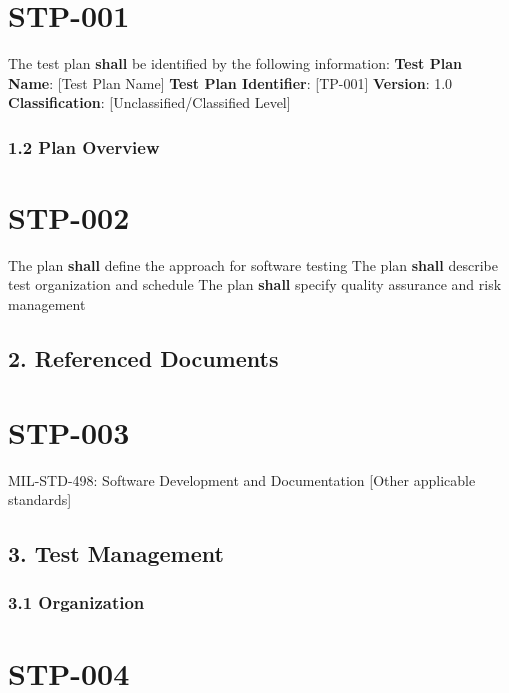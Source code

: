 \section{STP-001}\label{STP-001}

The test plan \textbf{shall} be identified by the following information:
\textbf{Test Plan Name}: [Test Plan Name]
\textbf{Test Plan Identifier}: [TP-001]
\textbf{Version}: 1.0
\textbf{Classification}: [Unclassified/Classified Level]

\subsubsection{1.2 Plan Overview}

\section{STP-002}\label{STP-002}

The plan \textbf{shall} define the approach for software testing
The plan \textbf{shall} describe test organization and schedule
The plan \textbf{shall} specify quality assurance and risk management

\subsection{2. Referenced Documents}

\section{STP-003}\label{STP-003}

MIL-STD-498: Software Development and Documentation
[Other applicable standards]\\

\subsection{3. Test Management}

\subsubsection{3.1 Organization}

\section{STP-004}\label{STP-004}

